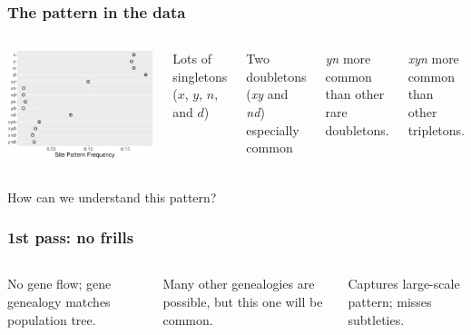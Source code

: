 \documentclass[pdftex,12pt]{beamer}
\begin{document}
\begin{frame}
  \frametitle{The pattern in the data}
  \begin{columns}
    \includegraphics[width=\linewidth]{xynd-frq.pdf}
    \raggedleft

    Lots of singletons ($x$, $y$, $n$, and $d$)

    \bigskip

    Two doubletons (\textit{xy} and \textit{nd}) especially common

    \bigskip

    \textit{yn} more common than other rare doubletons.

    \bigskip

    \textit{xyn} more common than other tripletons.
  \end{columns}
  \bigskip\raggedleft
How can we understand this pattern?
\end{frame}

\begin{frame}
  \frametitle{1st pass: no frills}
  \begin{columns}
    
    \raggedleft
    No gene flow; gene genealogy matches population tree.

    \bigskip

    Many other genealogies are possible, but this one will be common.

    \bigskip

    Captures large-scale pattern; misses subtleties.
  \end{columns}
\end{frame}
\end{document}
